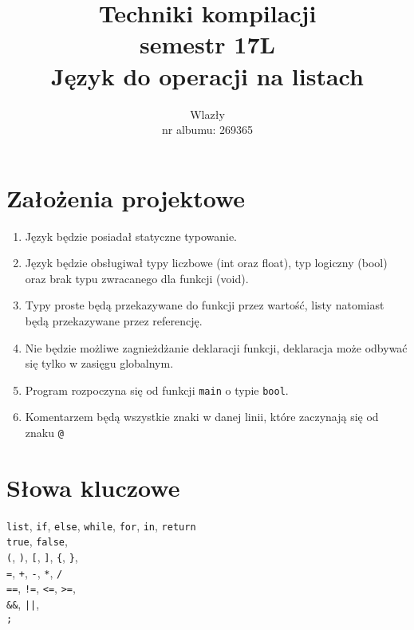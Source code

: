\documentclass{article}
\title{\vspace{7cm}\LARGE Techniki kompilacji\\semestr 17L\\Język do operacji na listach}
\author{\LargeŁukasz Wlazły\\nr albumu: 269365}
\date{}
\newcommand{\keyword}[1]{\colorbox{light-gray}{\texttt{#1}}}
\newcommand{\code}[1]{\texttt{#1}}
\begin{document}
\maketitle
{}
\newpage
{}

\section{Założenia projektowe}
\begin{enumerate}
\item Język będzie posiadał statyczne typowanie.
\item Język będzie obsługiwał typy liczbowe (int oraz float), typ logiczny (bool) oraz brak typu zwracanego dla funkcji (void).
\item Typy proste będą przekazywane do funkcji przez wartość, listy natomiast będą przekazywane przez referencję.
\item Nie będzie możliwe zagnieżdżanie deklaracji funkcji, deklaracja może odbywać się tylko w zasięgu globalnym.
\item Program rozpoczyna się od funkcji \code{main} o typie \keyword{bool}.
\item Komentarzem będą wszystkie znaki w danej linii, które zaczynają się od znaku \keyword{@}
\end{enumerate}

\section{Słowa kluczowe}
\keyword{list}, \keyword{if}, \keyword{else}, \keyword{while}, \keyword{for}, \keyword{in}, \keyword{return}\\
\keyword{true}, \keyword{false}, \\
\keyword{(}, \keyword{)}, \keyword{[}, \keyword{]}, \keyword{\{}, \keyword{\}}, \\
\keyword{=}, \keyword{+}, \keyword{-}, \keyword{*}, \keyword{/} \\
\keyword{==}, \keyword{!=}, \keyword{<=}, \keyword{>=}, \\
\keyword{\&\&}, \keyword{||}, \\
\keyword{;}
\newpage
\end{document}
